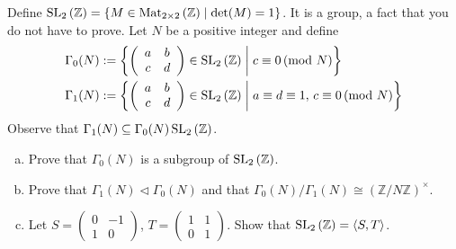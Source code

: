 \documentclass[10pt]{amsart}
\begin{document}
\begin{thm}
  Define $\operatorname{SL}_2\left(\mathbb{Z}\right) = \left\{ M \in \operatorname{Mat}_{2 \times 2}\left(\mathbb{Z}\right) \mid \det(M) = 1 \right\}$.
  It is a group, a fact that you do not have to prove.
  Let $N$ be a positive integer and define
  \begin{align*}
	\Gamma_0(N) & := \left\{ \left(
								\begin{array}{cc}
									a & b\\
									c & d
								\end{array}
								\right) \in \operatorname{SL}_2\left(\mathbb{Z}\right)
								\;\middle\vert\; c \equiv 0\, (\text{mod } N)
							\right\}\\
	\Gamma_1(N) & := \left\{ \left(
								\begin{array}{cc}
									a & b\\
									c & d
								\end{array}
								\right) \in \operatorname{SL}_2\left(\mathbb{Z}\right)
								\;\middle\vert\; a \equiv d \equiv 1,\, c \equiv 0\, (\text{mod } N)
							\right\}\\
  \end{align*}
  Observe that $\Gamma_1(N) \subseteq \Gamma_0(N) \operatorname{SL}_2\left(\mathbb{Z}\right)$.
  \begin{enumerate}[(a)]
	\item
		Prove that $\Gamma_0(N)$ is a subgroup of $\operatorname{SL}_2\left(\mathbb{Z}\right)$.
	\item
		Prove that $\Gamma_1(N) \lhd \Gamma_0(N)$ and that $\Gamma_0(N) / \Gamma_1(N) \cong (\mathbb{Z}/N\mathbb{Z})^{\times}$.
	\item
		Let $S = \left(
					\begin{array}{cc}
						0 & -1\\
						1 & 0
					\end{array}
				 \right)$,
				 $T = \left(
					\begin{array}{cc}
						1 & 1\\
						0 & 1
					\end{array}
				 \right)$.
				 Show that $\operatorname{SL}_2\left(\mathbb{Z}\right) = \left<S,T\right>$.
  \end{enumerate}
  

\end{thm}
\end{document}
